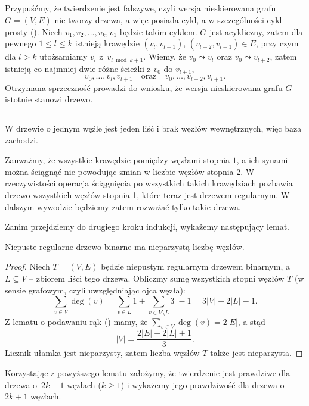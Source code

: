 \subsection{} %
Przypuśćmy, że twierdzenie jest fałszywe, czyli wersja nieskierowana grafu $G=(V,E)$ nie tworzy drzewa, a więc posiada cykl, a w szczególności cykl prosty (). Niech $v_1,v_2,\dots,v_k,v_1$ będzie takim cyklem. $G$ jest acykliczny, zatem dla pewnego $1\le l\le k$ istnieją krawędzie $(v_l,v_{l+1})$, $(v_{l+2},v_{l+1})\in E$, przy czym dla $l>k$ utożsamiamy $v_l$ z~$v_{l\bmod k+1}$. Wiemy, że $v_0\leadsto v_l$ oraz $v_0\leadsto v_{l+2}$, zatem istnieją co najmniej dwie różne ścieżki z $v_0$ do $v_{l+1}$,
\[
	v_0,\dots,v_l,v_{l+1} \quad\text{oraz}\quad v_0,\dots,v_{l+2},v_{l+1}.
\]
Otrzymana sprzeczność prowadzi do wniosku, że wersja nieskierowana grafu $G$ istotnie stanowi drzewo.

\subsection{} %
W drzewie o jednym węźle jest jeden liść i brak węzłów wewnętrznych, więc baza zachodzi.

Zauważmy, że wszystkie krawędzie pomiędzy węzłami stopnia $1$, a ich synami można ściągnąć nie powodując zmian w liczbie węzłów stopnia 2. W rzeczywistości operacja ściągnięcia po wszystkich takich krawędziach pozbawia drzewo wszystkich węzłów stopnia 1, które teraz jest drzewem regularnym. W dalszym wywodzie będziemy zatem rozważać tylko takie drzewa.

Zanim przejdziemy do drugiego kroku indukcji, wykażemy następujący lemat.
\begin{lemat*}
	Niepuste regularne drzewo binarne ma nieparzystą liczbę węzłów.
\end{lemat*}
\begin{proof}
Niech $T=(V,E)$ będzie niepustym regularnym drzewem binarnym, a~$L\subseteq V$ -- zbiorem liści tego drzewa. Obliczmy sumę wszystkich stopni węzłów $T$ (w sensie grafowym, czyli uwzględniając ojca węzła):
\[
	\sum_{v\in V}\deg(v) = \sum_{v\in L}1+\sum_{v\in V\setminus L}\!\!\!3\;-1=3|V|-2|L|-1.
\]
Z lematu o podawaniu rąk () mamy, że $\sum_{v\in V}\deg(v) = 2|E|$, a stąd
\[
	|V| = \frac{2|E|+2|L|+1}{3}.
\]
Licznik ułamka jest nieparzysty, zatem liczba węzłów $T$ także jest nieparzysta.

\end{proof}

Korzystając z powyższego lematu założymy, że twierdzenie jest prawdziwe dla drzewa o~$2k-1$ węzłach ($k\ge1$) i wykażemy jego prawdziwość dla drzewa o $2k+1$ węzłach.

